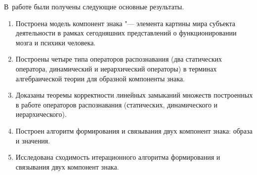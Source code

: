 \conclusion

В~работе были получены следующие основные результаты.

\begin{enumerate}
	\renewcommand\labelenumi{\theenumi.}
	\item Построена модель компонент знака "--- элемента картины мира субъекта деятельности в рамках сегодняшних представлений о функционировании мозга и психики человека.
	\item Построены четыре типа операторов распознавания (два статических оператора, динамический и иерархический операторы) в терминах алгебраической теории для образной компоненты знака.
	\item Доказаны теоремы корректности линейных замыканий множеств построенных в работе операторов распознавания (статических, динамического и иерархического).
	\item Построен алгоритм формирования и связывания двух компонент знака: образа и значения.
	\item Исследована сходимость итерационного алгоритма формирования и связывания двух компонент знака.
\end{enumerate}

\clearpage